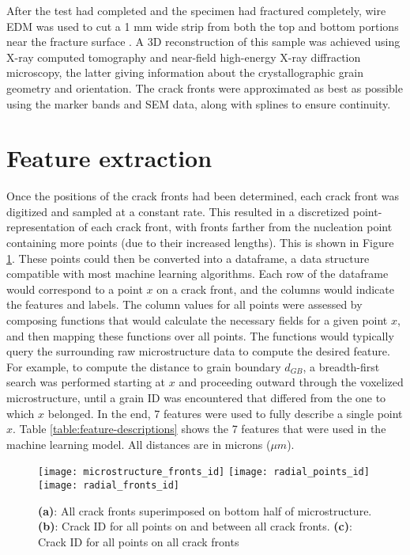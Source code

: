 After the test had completed and the specimen had fractured completely, wire EDM was used to cut a 1 mm wide strip from both the top and bottom portions near the fracture surface \cite{spear2014}.  A 3D reconstruction of this sample was achieved using X-ray computed tomography and near-field high-energy X-ray diffraction microscopy, the latter giving information about the crystallographic grain geometry and orientation.  The crack fronts were approximated as best as possible using the marker bands and SEM data, along with splines to ensure continuity.

\section{Feature extraction}
Once the positions of the crack fronts had been determined, each crack front was digitized and sampled at a constant rate.  This resulted in a discretized point-representation of each crack front, with fronts farther from the nucleation point containing more points (due to their increased lengths).  This is shown in Figure \ref{fig:crack_fronts}.  These points could then be converted into a dataframe, a data structure compatible with most machine learning algorithms.  Each row of the dataframe would correspond to a point $x$ on a crack front, and the columns would indicate the features and labels.  The column values for all points were assessed by composing functions that would calculate the necessary fields for a given point $x$, and then mapping these functions over all points.  The functions would typically query the surrounding raw microstructure data to compute the desired feature.  For example, to compute the distance to grain boundary $d_{GB}$, a breadth-first search was performed starting at $x$ and proceeding outward through the voxelized microstructure, until a grain ID was encountered that differed from the one to which $x$ belonged.  In the end, 7 features were used to fully describe a single point $x$.  Table \ref{table:feature-descriptions} shows the 7 features that were used in the machine learning model.  All distances are in microns ($\mu m$).

\begin{figure}[p]
  \centering
    \texttt{[image: microstructure\_fronts\_id]}
    \texttt{[image: radial\_points\_id]}
    \texttt{[image: radial\_fronts\_id]}

    \caption{\textbf{(a)}: All crack fronts superimposed on bottom half of microstructure.
             \textbf{(b)}: Crack ID for all points on and between all crack fronts.
             \textbf{(c)}: Crack ID for all points on all crack fronts}
  \label{fig:crack_fronts}
\end{figure}

